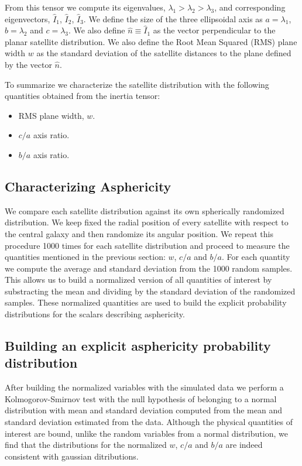\documentclass[a4paper,fleqn,usenatbib]{mnras}
\begin{document}
From this tensor we compute its eigenvalues,
$\lambda_1>\lambda_2>\lambda_3$, and corresponding eigenvectors,
$\hat{I}_1$, $\hat{I}_2$, $\hat{I}_3$.
We define the size of the three ellipsoidal axis as
$a=\lambda_1$, $b=\lambda_2$ and $c=\lambda_3$.
We also define $\hat{n}\equiv \hat{I}_1$ as the vector perpendicular to the
planar satellite distribution. 
We also define the Root Mean Squared (RMS) plane width $w$ as the
standard deviation of the satellite distances to the plane defined by
the vector $\hat{n}$.    

To summarize we characterize the satellite distribution with the following
quantities obtained from the inertia tensor: 
\begin{itemize}
\item RMS plane width, $w$.
\item $c/a$ axis ratio.
\item $b/a$ axis ratio.
\end{itemize}



\subsection{Characterizing Asphericity}

We compare each satellite distribution against its own spherically
randomized distribution.
We keep fixed the radial position of every satellite
with respect to the central galaxy and then randomize its angular
position. 
We repeat this procedure 1000 times for each satellite distribution
and proceed to measure the quantities mentioned in the previous section:
$w$, $c/a$ and $b/a$.
For each quantity we compute the average and standard deviation from
the 1000 random samples. 
This allows us to build a normalized version of all quantities of
interest by substracting the mean and dividing by the standard
deviation of the randomized samples.
These normalized quantities are used to build the explicit probability
distributions for the scalars describing asphericity.


\subsection{Building an explicit asphericity probability distribution}

After building the normalized variables with the simulated data we
perform a Kolmogorov-Smirnov test with the null hypothesis of belonging
to a normal distribution with mean and standard deviation computed
from the mean and standard deviation estimated from the data.
Although the physical quantities of interest are bound, unlike the
random variables from a normal distribution, we find that the
distributions for the normalized $w$, $c/a$ and $b/a$ are indeed
consistent with gaussian ditributions. 
\end{document}
